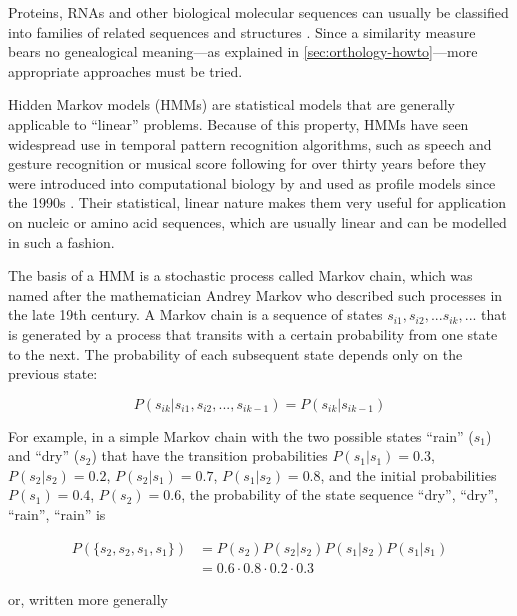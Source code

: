 \label{sec:hmms}
Proteins, RNAs and other biological molecular sequences can usually be
classified into families of related sequences and structures
\citep{henikoff1997}. Since a similarity measure bears no genealogical
meaning---as explained in \autoref{sec:orthology-howto}---more appropriate
approaches must be tried.

Hidden Markov models (HMMs) are statistical models that are generally applicable
to ``linear'' problems. Because of this property, HMMs have seen widespread use
in temporal pattern recognition algorithms, such as speech and gesture
recognition or musical score following for over thirty years \citep{rabiner1989}
before they were introduced into computational biology by \citet{churchill1989}
and used as profile models since the 1990s \citep{krogh1994}. Their statistical,
linear nature makes them very useful for application on nucleic or amino acid
sequences, which are usually linear and can be modelled in such a fashion. 

The basis of a HMM is a stochastic process called Markov chain, which was named
after the mathematician Andrey Markov who described such processes in the late
19th century. A Markov chain is a sequence of states $s_{i1}, s_{i2}, ...
s_{ik}, ...$ that is generated by a process that transits with a certain
probability from one state to the next. The probability of each subsequent state
depends only on the previous state:

\begin{equation}
P(s_{ik} | s_{i1}, s_{i2}, ..., s_{ik-1}) = P(s_{ik} | s_{ik-1})
\label{eqn:markov-chain}
\end{equation}

For example, in a simple Markov chain with the two possible states ``rain''
($s_1$) and ``dry'' ($s_2$) that have the transition probabilities $P(s_1|s_1) =
0.3$, $P(s_2|s_2) = 0.2$, $P(s_2|s_1) = 0.7$, $P(s_1|s_2) = 0.8$, and the
initial probabilities $P(s_1) = 0.4$, $P(s_2) = 0.6$, the probability of the
state sequence ``dry'', ``dry'', ``rain'', ``rain'' is

\begin{equation}
	\begin{split}
		P(\{s_2, s_2, s_1, s_1\}) &= P(s_2) P(s_2|s_2) P(s_1|s_2) P(s_1|s_1) \\
		&= 0.6 \cdot 0.8 \cdot 0.2 \cdot 0.3 
	\end{split}
\label{eqn:markov-chain-weather}
\end{equation}

or, written more generally

